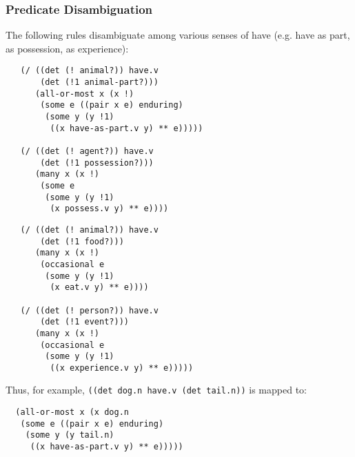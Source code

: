 \documentclass[8pt]{beamer}
\begin{document}
\begin{frame}[fragile]
  \frametitle{Predicate Disambiguation}
The following rules disambiguate among various senses of have (e.g. have as part, as possession, as experience): 
\begin{multicols}{2}
\begin{verbatim}
   (/ ((det (! animal?)) have.v 
       (det (!1 animal-part?)))
      (all-or-most x (x !)
       (some e ((pair x e) enduring)
        (some y (y !1)
         ((x have-as-part.v y) ** e)))))

   (/ ((det (! agent?)) have.v 
       (det (!1 possession?)))
      (many x (x !)
       (some e
        (some y (y !1)
         (x possess.v y) ** e))))
\end{verbatim}
\begin{verbatim}
   (/ ((det (! animal?)) have.v 
       (det (!1 food?)))
      (many x (x !)
       (occasional e
        (some y (y !1)
         (x eat.v y) ** e))))

   (/ ((det (! person?)) have.v 
       (det (!1 event?)))
      (many x (x !)
       (occasional e
        (some y (y !1)
         ((x experience.v y) ** e)))))
\end{verbatim}
\end{multicols}
Thus, for example, \texttt{((det dog.n have.v (det tail.n))} is mapped to:
\begin{verbatim}
  (all-or-most x (x dog.n
   (some e ((pair x e) enduring)
    (some y (y tail.n)
     ((x have-as-part.v y) ** e)))))
\end{verbatim}
\end{frame}
\end{document}
